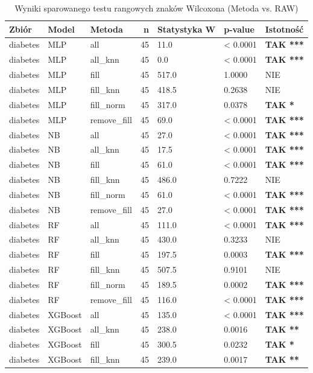 \begin{table}[htbp]
\caption{Wyniki sparowanego testu rangowych znaków Wilcoxona (Metoda vs. RAW)}
\label{tab:test_wilcoxon}
\begin{tabular}{lllrlll}
\toprule
Zbiór & Model & Metoda & n & Statystyka W & p-value & Istotność \\
\midrule
diabetes & MLP & all & 45 & 11.0 & < 0.0001 & \textbf{TAK ***} \\
diabetes & MLP & all_knn & 45 & 0.0 & < 0.0001 & \textbf{TAK ***} \\
diabetes & MLP & fill & 45 & 517.0 & 1.0000 & NIE \\
diabetes & MLP & fill_knn & 45 & 418.5 & 0.2638 & NIE \\
diabetes & MLP & fill_norm & 45 & 317.0 & 0.0378 & \textbf{TAK *} \\
diabetes & MLP & remove_fill & 45 & 69.0 & < 0.0001 & \textbf{TAK ***} \\
diabetes & NB & all & 45 & 27.0 & < 0.0001 & \textbf{TAK ***} \\
diabetes & NB & all_knn & 45 & 17.5 & < 0.0001 & \textbf{TAK ***} \\
diabetes & NB & fill & 45 & 61.0 & < 0.0001 & \textbf{TAK ***} \\
diabetes & NB & fill_knn & 45 & 486.0 & 0.7222 & NIE \\
diabetes & NB & fill_norm & 45 & 61.0 & < 0.0001 & \textbf{TAK ***} \\
diabetes & NB & remove_fill & 45 & 27.0 & < 0.0001 & \textbf{TAK ***} \\
diabetes & RF & all & 45 & 111.0 & < 0.0001 & \textbf{TAK ***} \\
diabetes & RF & all_knn & 45 & 430.0 & 0.3233 & NIE \\
diabetes & RF & fill & 45 & 197.5 & 0.0003 & \textbf{TAK ***} \\
diabetes & RF & fill_knn & 45 & 507.5 & 0.9101 & NIE \\
diabetes & RF & fill_norm & 45 & 189.5 & 0.0002 & \textbf{TAK ***} \\
diabetes & RF & remove_fill & 45 & 116.0 & < 0.0001 & \textbf{TAK ***} \\
diabetes & XGBoost & all & 45 & 135.0 & < 0.0001 & \textbf{TAK ***} \\
diabetes & XGBoost & all_knn & 45 & 238.0 & 0.0016 & \textbf{TAK **} \\
diabetes & XGBoost & fill & 45 & 300.5 & 0.0232 & \textbf{TAK *} \\
diabetes & XGBoost & fill_knn & 45 & 239.0 & 0.0017 & \textbf{TAK **} \\

\end{tabular}
\end{table}
